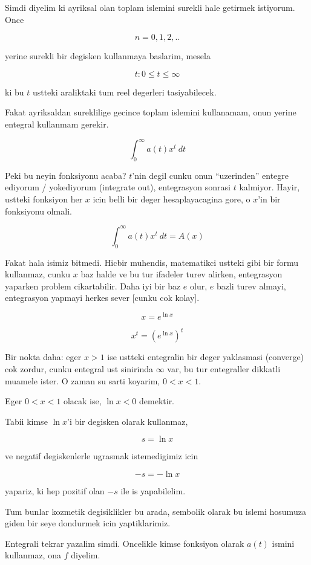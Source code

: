 \documentclass[12pt,fleqn]{article}\usepackage{../common}
\begin{document}
Simdi diyelim ki ayriksal olan toplam islemini surekli hale getirmek
istiyorum. Once

\[ n = 0,1,2,.. \]

yerine surekli bir degisken kullanmaya baslarim, mesela

\[ t: 0 \le t \le \infty \]

ki bu $t$ ustteki araliktaki tum reel degerleri tasiyabilecek. 

Fakat ayriksaldan sureklilige gecince toplam islemini kullanamam, onun
yerine entegral kullanmam gerekir. 

\[ \int_0^{\infty} a(t)x^t \ dt \]

Peki bu neyin fonksiyonu acaba? $t$'nin degil cunku onun ``uzerinden''
entegre ediyorum / yokediyorum (integrate out), entegrasyon sonrasi $t$
kalmiyor. Hayir, ustteki fonksiyon her $x$ icin belli bir deger
hesaplayacagina gore, o $x$'in bir fonksiyonu olmali. 

\[ \int_0^{\infty} a(t)x^t \ dt = A(x)\]

Fakat hala isimiz bitmedi. Hicbir muhendis, matematikci ustteki gibi bir
formu kullanmaz, cunku $x$ baz halde ve bu tur ifadeler turev alirken,
entegrasyon yaparken problem cikartabilir. Daha iyi bir baz $e$ olur, $e$
bazli turev almayi, entegrasyon yapmayi herkes sever [cunku cok kolay]. 

\[ x = e^{\ln x} \]

\[ x^t = (e^{\ln x})^t \]

Bir nokta daha: eger $x > 1$ ise ustteki entegralin bir deger yaklasmasi
(converge) cok zordur, cunku entegral ust sinirinda $\infty$ var, bu tur
entegraller dikkatli muamele ister. O zaman su sarti koyarim, $0 < x < 1$. 

Eger  $0 < x < 1$ olacak ise, $\ln x < 0$ demektir. 

Tabii kimse $\ln x$'i bir degisken olarak kullanmaz, 

\[ s = \ln x \]

ve negatif degiskenlerle ugrasmak istemedigimiz icin 

\[ -s = -\ln x \] 

yapariz, ki hep pozitif olan $-s$ ile is yapabilelim. 

Tum bunlar kozmetik degisiklikler bu arada, sembolik olarak bu islemi
hosumuza giden bir seye dondurmek icin yaptiklarimiz. 

Entegrali tekrar yazalim simdi. Oncelikle kimse fonksiyon olarak $a(t)$
ismini kullanmaz, ona $f$ diyelim. 
\end{document}
